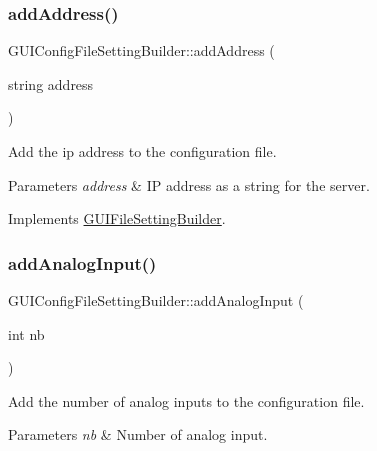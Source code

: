 \subsubsection{\texorpdfstring{add\+Address()}{addAddress()}}
{\footnotesize\ttfamily G\+U\+I\+Config\+File\+Setting\+Builder\+::add\+Address (\begin{DoxyParamCaption}\item[{string}]{address }\end{DoxyParamCaption})\hspace{0.3cm}{\ttfamily [virtual]}}



Add the ip address to the configuration file. 


\begin{DoxyParams}{Parameters}
{\em address} & IP address as a string for the server. \\
\hline
\end{DoxyParams}


Implements \mbox{\hyperlink{class_g_u_i_file_setting_builder_a4dff49cea1e4861e66ed57e258b702da}{G\+U\+I\+File\+Setting\+Builder}}.

\mbox{\label{class_g_u_i_config_file_setting_builder_ae59473c0fb774b24b6a96a1b6e371dd1}} 
\subsubsection{\texorpdfstring{add\+Analog\+Input()}{addAnalogInput()}}
{\footnotesize\ttfamily G\+U\+I\+Config\+File\+Setting\+Builder\+::add\+Analog\+Input (\begin{DoxyParamCaption}\item[{int}]{nb }\end{DoxyParamCaption})\hspace{0.3cm}{\ttfamily [virtual]}}



Add the number of analog inputs to the configuration file. 


\begin{DoxyParams}{Parameters}
{\em nb} & Number of analog input. \\
\hline
\end{DoxyParams}


